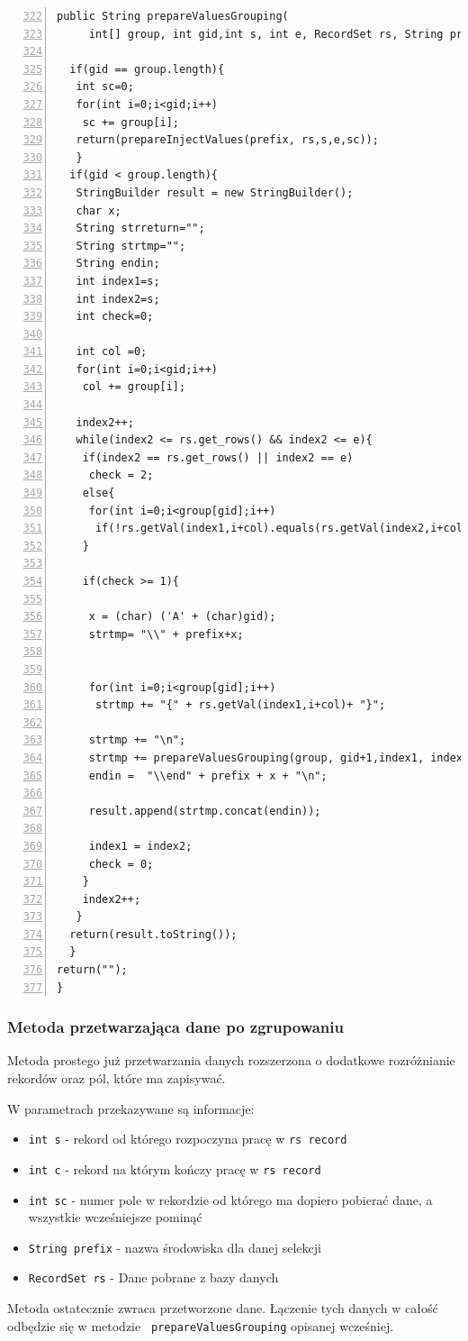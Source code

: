  \begin{lstlisting}[numbers=left,firstnumber=322]
 public String prepareValuesGrouping(
	 int[] group, int gid,int s, int e, RecordSet rs, String prefix){

  if(gid == group.length){
   int sc=0;
   for(int i=0;i<gid;i++)
    sc += group[i];
   return(prepareInjectValues(prefix, rs,s,e,sc));
   }
  if(gid < group.length){
   StringBuilder result = new StringBuilder(); 
   char x;
   String strreturn="";
   String strtmp="";
   String endin;
   int index1=s;
   int index2=s;
   int check=0;

   int col =0;
   for(int i=0;i<gid;i++)
    col += group[i];
          
   index2++;
   while(index2 <= rs.get_rows() && index2 <= e){
    if(index2 == rs.get_rows() || index2 == e)
     check = 2;
    else{
     for(int i=0;i<group[gid];i++)
      if(!rs.getVal(index1,i+col).equals(rs.getVal(index2,i+col)))check = 1;
    }
           
    if(check >= 1){

     x = (char) ('A' + (char)gid);
     strtmp= "\\" + prefix+x;
               
               
     for(int i=0;i<group[gid];i++)
      strtmp += "{" + rs.getVal(index1,i+col)+ "}";
               
     strtmp += "\n"; 
     strtmp += prepareValuesGrouping(group, gid+1,index1, index2, rs, prefix);
     endin =  "\\end" + prefix + x + "\n";

     result.append(strtmp.concat(endin));

     index1 = index2;
     check = 0;
    }
    index2++;
   }
  return(result.toString());    
  }
return("");
}
\end{lstlisting}


\subsubsection*{Metoda przetwarzająca dane po zgrupowaniu}


Metoda prostego już przetwarzania danych rozszerzona o dodatkowe rozróżnianie rekordów oraz pól, które ma zapisywać. 
\par 
W parametrach przekazywane są informacje:
\begin{itemize}
\item \texttt{int s} - rekord od którego rozpoczyna pracę w \texttt{rs record}
\item \texttt{int c} - rekord na którym kończy pracę w \texttt{rs record}
\item \texttt{int sc} - numer pole w rekordzie od którego ma dopiero pobierać dane, a wszystkie wcześniejsze pominąć
\item\texttt{String  prefix} -  nazwa środowiska dla danej selekcji
\item \texttt{RecordSet rs} - Dane pobrane z bazy danych
\end{itemize}
\vspace{5mm}
Metoda ostatecznie zwraca przetworzone dane. Łączenie tych danych w całość odbędzie się w metodzie \texttt{ prepareValuesGrouping} opisanej wcześniej.

